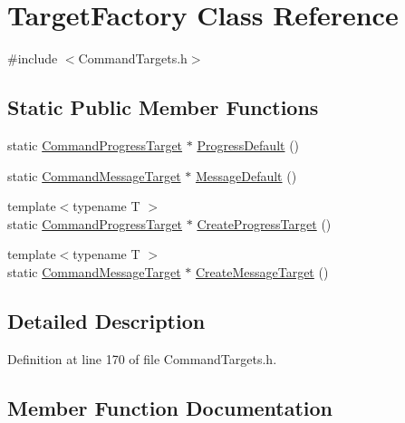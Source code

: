 \hypertarget{class_target_factory}{}\section{Target\+Factory Class Reference}
\label{class_target_factory}


{\ttfamily \#include $<$Command\+Targets.\+h$>$}

\subsection*{Static Public Member Functions}
\begin{DoxyCompactItemize}
\item 
static \hyperlink{class_command_progress_target}{Command\+Progress\+Target} $\ast$ \hyperlink{class_target_factory_a9e9b9854148982923ded8ce7dc3cac0e}{Progress\+Default} ()
\item 
static \hyperlink{class_command_message_target}{Command\+Message\+Target} $\ast$ \hyperlink{class_target_factory_aa6f75ce7a6b1fee183b99d1b23d79eb5}{Message\+Default} ()
\item 
{\footnotesize template$<$typename T $>$ }\\static \hyperlink{class_command_progress_target}{Command\+Progress\+Target} $\ast$ \hyperlink{class_target_factory_a72577b18d75e186d48c6063140a73cb8}{Create\+Progress\+Target} ()
\item 
{\footnotesize template$<$typename T $>$ }\\static \hyperlink{class_command_message_target}{Command\+Message\+Target} $\ast$ \hyperlink{class_target_factory_a2fde22a8e78f6e949048dca29d1e4401}{Create\+Message\+Target} ()
\end{DoxyCompactItemize}


\subsection{Detailed Description}


Definition at line 170 of file Command\+Targets.\+h.



\subsection{Member Function Documentation}
